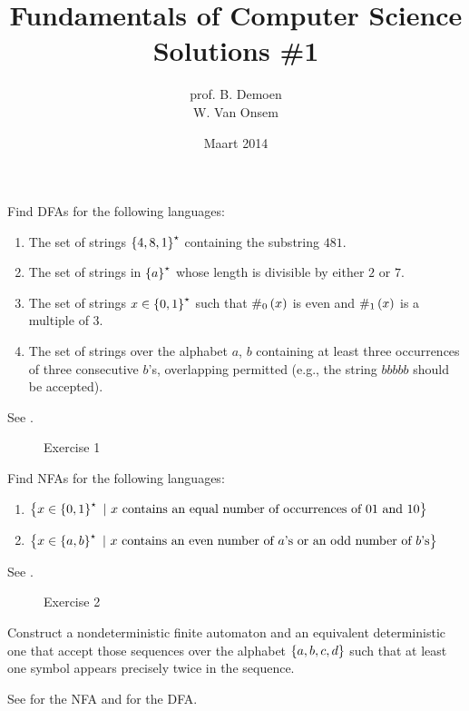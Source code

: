 \documentclass{article}
\title{Fundamentals of Computer Science\\Solutions \#1}
\author{prof. B. Demoen\\W. Van Onsem}
\date{Maart 2014}
\begin{document}
\maketitle
\begin{exercise}
Find DFAs for the following languages:
\begin{enumerate}
 \item The set of strings $\left\{ 4,8,1 \right\}^{\star}$ containing the substring $481$.
 \item The set of strings in $\left\{ a \right\}^{\star}$ whose length is divisible by either $2$ or $7$.
 \item The set of strings $x\in\left\{ 0,1 \right\}^{\star}$ such that $\#_0\left( x \right)$ is even and $\#_1\left( x \right)$ is a multiple of $3$.
 \item The set of strings over the alphabet $a$, $b$ containing at least three occurrences of three consecutive $b$'s, overlapping permitted (e.g., the string $bbbbb$ should be accepted).
\end{enumerate}
\begin{answer}See .
\begin{figure}[H]
\centering
{}
\caption{Exercise 1}
\end{figure}
\end{answer}
\end{exercise}
\begin{exercise}
Find NFAs for the following languages:
\begin{enumerate}
 \item $\left\{ x\in\left\{ 0,1 \right\}^{\star}\ |\ \mbox{$x$ contains an equal number of occurrences of $01$ and $10$} \right\}$
 \item $\left\{ x\in\left\{ a,b \right\}^{\star}\ |\ \mbox{$x$ contains an even number of $a$'s or an odd number of $b$'s} \right\}$
\end{enumerate}
\begin{answer}See .
\begin{figure}[H]
\centering
{}
\caption{Exercise 2}
\end{figure}
\end{answer}
\end{exercise}
\begin{exercise}
Construct a nondeterministic finite automaton and an equivalent deterministic one that accept those sequences over the alphabet $\left\{ a,b,c,d \right\}$ such that at least one symbol appears precisely twice in the sequence.
\begin{answer}
See  for the NFA and  for the DFA.
\end{answer}
\end{exercise}
\end{document}
